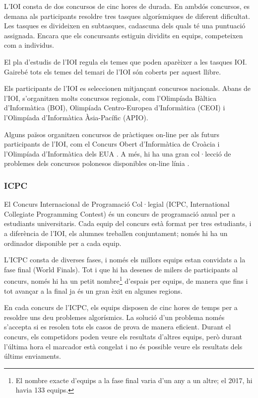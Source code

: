 L'IOI consta de dos concursos de cinc hores de durada.
En ambdós concursos, es demana als participants
resoldre tres tasques algor\'ismiques de diferent dificultat.
Les tasques es divideixen en subtasques,
cadascuna dels quals té una puntuació assignada.
Encara que els concursants estiguin dividits en equips,
competeixen com a individus.

El pla d'estudis de l'IOI \cite{iois} regula els temes
que poden aparèixer a les tasques IOI.
Gairebé tots els temes del temari de l'IOI
són coberts per aquest llibre.

Els participants de l'IOI es seleccionen mitjançant
concursos nacionals.
Abans de l'IOI, s'organitzen molts concursos regionals,
com l'Olimpíada Bàltica d'Informàtica (BOI),
Olimpíada Centro-Europea d'Informàtica (CEOI)
i l'Olimpíada d'Informàtica Àsia-Pacífic (APIO).

Alguns països organitzen concursos de pràctiques on-line
per als futurs participants de l'IOI,
com el Concurs Obert d'Informàtica de Croàcia \cite{coci}
i l'Olimpíada d'Informàtica dels EUA \cite{usaco}.
A més, hi ha una gran col·lecció de problemes dels concursos polonesos
disponibles on-line línia \cite{main}.

\subsubsection{ICPC}

El Concurs Internacional de Programació Col·legial (ICPC,
International Collegiate Programming Contest)
és un concurs de programació anual per a estudiants universitaris.
Cada equip del concurs està format per tres estudiants,
i a diferència de l'IOI, els alumnes treballen conjuntament;
només hi ha un ordinador disponible per a cada equip.

L'ICPC consta de diverses fases, i nom\'es els millors
equips estan convidats a la fase final (World Finals).
Tot i que hi ha desenes de milers de participants
al concurs, només hi ha un petit nombre\footnote{El nombre exacte d'equips
a la fase final varia d'un any a un altre; el 2017, hi havia
133 equips.} d'espais per equips, de manera que fins i tot avançar a
la final ja és un gran èxit en algunes regions.

En cada concurs de l'ICPC, els equips disposen de cinc hores de temps
per a resoldre uns deu problemes algor\'ismics.
La solució d'un problema només s'accepta si es resolen
tots els casos de prova de manera eficient.
Durant el concurs, els competidors poden veure els resultats d'altres equips,
però durant l'última hora el marcador està congelat i no \'es
possible veure els resultats dels últims enviaments.

